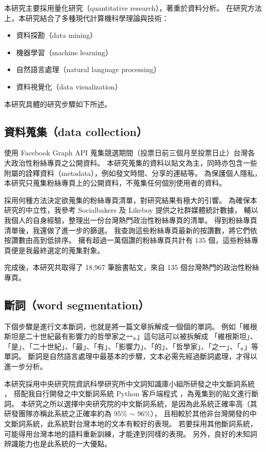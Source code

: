 \documentclass[a4paper, 10pt, conference]{ieeeconf}       %
\begin{document}
\begin{CJK}{UTF8}{bsmi}
本研究主要採用量化研究（quantitative research），著重於資料分析。%
在研究方法上，本研究結合了多種現代計算機科學理論與技術：%
\begin{itemize}
\item 資料探勘（data mining）%
\item 機器學習（machine learning）%
\item 自然語言處理（natural language processing）%
\item 資料視覺化（data visualization）%
\end{itemize}

本研究具體的研究步驟如下所述。%

\subsection*{資料蒐集（data collection）}

使用 Facebook Graph API 蒐集競選期間（投票日前三個月至投票日止）台灣各大政治性粉絲專頁之公開資料。%
本研究蒐集的資料以貼文為主，同時亦包含一些附屬的詮釋資料（metadata），例如發文時間、分享的連結等。%
為保護個人隱私，本研究只蒐集粉絲專頁上的公開資料，不蒐集任何個別使用者的資料。%

採用何種方法決定欲蒐集的粉絲專頁清單，對研究結果有極大的引響。%
為確保本研究的中立性，我參考 Socialbakers \cite{c4} 及 Likeboy \cite{c5} 提供之社群媒體統計數據，%
輔以我個人的自身經驗，整理出一份台灣熱門政治性粉絲專頁的清單。%
得到粉絲專頁清單後，我還做了進一步的篩選。%
我查詢這些粉絲專頁最新的按讚數，將它們依按讚數由高到低排序。%
擁有超過一萬個讚的粉絲專頁共計有 135 個，這些粉絲專頁便是我最終選定的蒐集對象。%

完成後，本研究共取得了 18,967 筆臉書貼文，來自 135 個台灣熱門的政治性粉絲專頁。%

\subsection*{斷詞（word segmentation）}

下個步驟是進行文本斷詞，也就是將一篇文章拆解成一個個的單詞。%
例如「維根斯坦是二十世紀最有影響力的哲學家之一。」這句話可以被拆解成%
「維根斯坦」、「是」、「二十世紀」、「最」、「有」、「影響力」、「的」、「哲學家」、「之一」、「。」等單詞。%
斷詞是自然語言處理中最基本的步驟，文本必需先經過斷詞處理，才得以進一步分析。%

本研究採用中央研究院資訊科學研究所中文詞知識庫小組所研發之中文斷詞系統 \cite{c6}，%
搭配我自行開發之中文斷詞系統 Python 客戶端程式 \cite{c7}，為蒐集到的貼文進行斷詞。%
本研究之所以選擇中央研究院的中文斷詞系統，是因為此系統正確率高（其研發團隊亦稱此系統之正確率約為 95\% $\sim$ 96\%），%
且相較於其他非台灣開發的中文斷詞系統，此系統對台灣本地的文本有較好的表現。%
若要採用其他斷詞系統，可能得用台灣本地的語料重新訓練，才能達到同樣的表現。%
另外，良好的未知詞辨識能力也是此系統的一大優點。%


\end{CJK}
\end{document}
